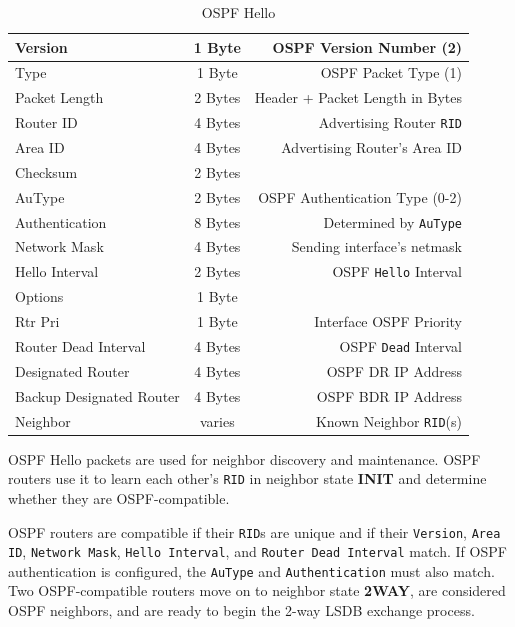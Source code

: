\documentclass[12pt]{article}
\begin{document}
	\begin{table}[H]
	\centering
	\caption{OSPF Hello \label{tab:OSPF HELLO}}
	\begin{tabular}{| l | c | r |}
	\hline
	Version				& 1 Byte	& OSPF Version Number (2)\\\hline
	Type					& 1 Byte	& OSPF Packet Type (1)\\\hline
	Packet Length			& 2 Bytes	& Header + Packet Length in Bytes\\\hline
	Router ID				& 4 Bytes	& Advertising Router \texttt{RID}\\\hline
	Area ID				& 4 Bytes	& Advertising Router's Area ID\\\hline
	Checksum				& 2 Bytes	&\\\hline
	AuType				& 2 Bytes	& OSPF Authentication Type (0-2)\\\hline
	Authentication			& 8 Bytes	& Determined by \texttt{AuType}\\\hline
	Network Mask			& 4 Bytes	& Sending interface's netmask\\\hline
	Hello Interval			& 2 Bytes	& OSPF \texttt{Hello} Interval\\\hline
	Options				& 1 Byte	&\\\hline
	Rtr Pri				& 1 Byte	& Interface OSPF Priority\\\hline
	Router Dead Interval		& 4 Bytes	& OSPF \texttt{Dead} Interval\\\hline
	Designated Router		& 4 Bytes	& OSPF DR IP Address\\\hline
	Backup Designated Router	& 4 Bytes	& OSPF BDR IP Address\\\hline
	Neighbor				& varies	& Known Neighbor \texttt{RID}(s)\\\hline
	\end{tabular}\end{table}
	OSPF Hello packets are used for neighbor discovery and maintenance. OSPF routers use it to learn each other's \texttt{RID} in neighbor state \textbf{INIT} and determine whether they are OSPF-compatible.
	
	OSPF routers are compatible if their \texttt{RID}s are unique and if their \texttt{Version}, \texttt{Area ID}, \texttt{Network Mask}, \texttt{Hello Interval}, and \texttt{Router Dead Interval} match. If OSPF authentication is configured, the \texttt{AuType} and \texttt{Authentication} must also match. Two OSPF-compatible routers move on to neighbor state \textbf{2WAY}, are considered OSPF neighbors, and are ready to begin the 2-way LSDB exchange process.
	
\end{document}
